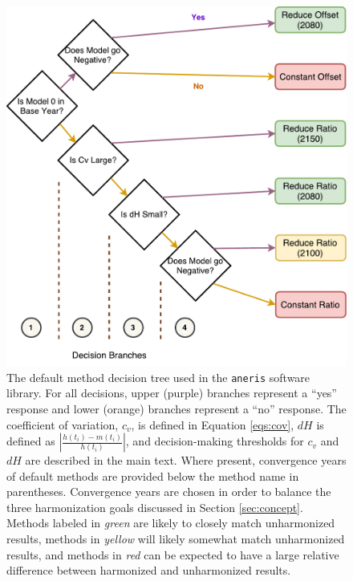 \documentclass[review]{elsarticle}
\newcommand{\code}[1]{\lstinline[basicstyle=\ttfamily\color{black}]|#1|}
\begin{document}
\begin{figure}
  \begin{center}
    \includegraphics[width=\textwidth]{decision_tree.pdf}
    \caption[]{
      \label{fig:decision_tree}
      The default method decision tree used in the \code{aneris} software
      library. For all decisions, upper (purple) branches represent a ``yes''
      response and lower (orange) branches represent a ``no'' response. The
      coefficient of variation, $c_v$, is defined in Equation \ref{eqs:cov},
      $dH$ is defined as $\left|\frac{h(t_i) - m(t_i)}{h(t_i)}\right|$, and
      decision-making thresholds for $c_v$ and $dH$ are described in the main text.  Where
      present, convergence years of default methods are provided below the
      method name in parentheses.  Convergence years are chosen in order to
      balance the three harmonization goals discussed in Section
      \ref{sec:concept}. Methods labeled in \textit{green} are likely to closely
      match unharmonized results, methods in \textit{yellow} will likely
      somewhat match unharmonized results, and methods in \textit{red} can be
      expected to have a large relative difference between harmonized and
      unharmonized results.}
  \end{center}
\end{figure}
\end{document}

